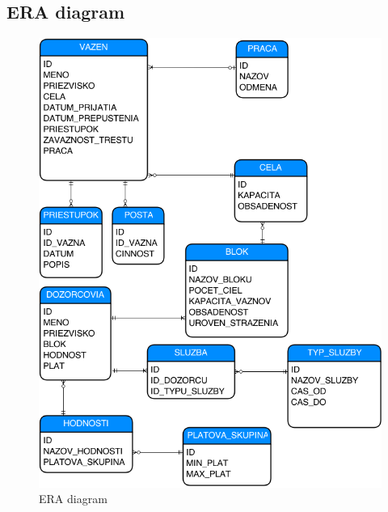 \documentclass[slovak, 12pt, Times New Roman]{article}
\begin{document}
		\subsection{ERA diagram}
			\begin{figure}[!htb]
				\centering
				\includegraphics[scale=0.6]{ERAdia.png}
				\caption{ERA diagram}
				\label{fig:Reinforcement}
			\end{figure}
\end{document}
